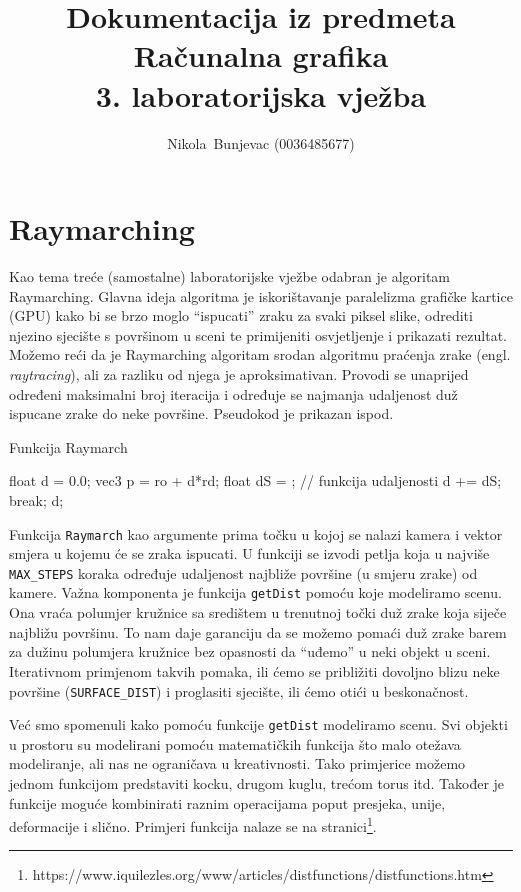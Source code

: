 \documentclass[a4paper,12pt]{article}
\author{Nikola~Bunjevac (0036485677)}
\title{Dokumentacija iz predmeta Računalna grafika\\{\normalsize 3. laboratorijska vježba}}
\newcommand{\eng}[1]{(engl. \textsl{#1}\/)}
\begin{document}
\maketitle

\section{Raymarching}

Kao tema treće (samostalne) laboratorijske vježbe odabran je algoritam Raymarching. Glavna ideja
algoritma je iskorištavanje paralelizma grafičke kartice (GPU) kako bi se brzo moglo ``ispucati''
zraku za svaki piksel slike, odrediti njezino sjecište s površinom u sceni te primijeniti
osvjetljenje i prikazati rezultat. Možemo reći da je Raymarching algoritam srodan algoritmu
praćenja zrake \eng{raytracing}, ali za razliku od njega je aproksimativan. Provodi se unaprijed
određeni maksimalni broj iteracija i određuje se najmanja udaljenost duž ispucane zrake do neke površine.
Pseudokod je prikazan ispod.
\begin{algorithm}[H]
  \caption{Funkcija Raymarch}
  \begin{algorithmic}[1]
    \State float d = 0.0;
    \State vec3 p = ro + d*rd;
    \State float dS = ; // funkcija udaljenosti
    \State d += dS;
    \State break;
    \EndIf
    \EndFor
    \State \Return d;
    \EndFunction
  \end{algorithmic}
  \label{alg:raymarch}
\end{algorithm}
Funkcija \verb|Raymarch| kao argumente prima točku u kojoj se nalazi kamera i vektor smjera
u kojemu će se zraka ispucati. U funkciji se izvodi petlja koja u najviše \verb|MAX_STEPS| koraka
određuje udaljenost najbliže površine (u smjeru zrake) od kamere. Važna komponenta je funkcija
\verb|getDist| pomoću koje modeliramo scenu. Ona vraća polumjer kružnice sa središtem u trenutnoj
točki duž zrake koja siječe najbližu površinu. To nam daje garanciju da se možemo pomaći duž zrake
barem za dužinu polumjera kružnice bez opasnosti da ``uđemo'' u neki objekt u sceni. Iterativnom
primjenom takvih pomaka, ili ćemo se približiti dovoljno blizu neke površine (\verb|SURFACE_DIST|)
i proglasiti sjecište, ili ćemo otići u beskonačnost.

Već smo spomenuli kako pomoću funkcije \verb|getDist| modeliramo scenu. Svi objekti u prostoru su
modelirani pomoću matematičkih funkcija što malo otežava modeliranje, ali nas ne ograničava u
kreativnosti. Tako primjerice možemo jednom funkcijom predstaviti kocku, drugom kuglu, trećom
torus itd. Također je funkcije moguće kombinirati raznim operacijama poput presjeka, unije,
deformacije i slično. Primjeri funkcija nalaze se na stranici\footnote{https://www.iquilezles.org/www/articles/distfunctions/distfunctions.htm}.
\end{document}
